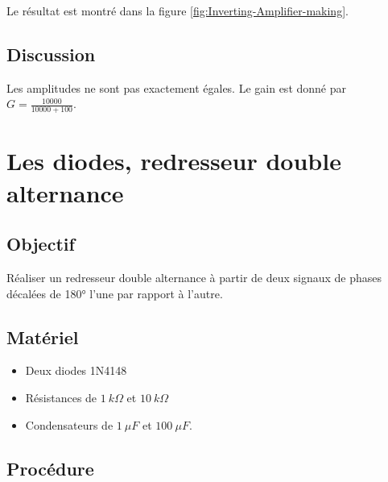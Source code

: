 \documentclass{book}
\begin{document}
Le résultat est montré dans la figure  \ref{fig:Inverting-Amplifier-making}.

\subsection{Discussion}


Les amplitudes ne sont pas exactement égales. Le gain est donné par $G=\frac{10000}{10000+100}$.







\section{Les diodes, redresseur double alternance}



\subsection{Objectif}


Réaliser un redresseur double alternance à partir de deux signaux de phases décalées de 180° l'une par rapport à l'autre.




\subsection{Matériel}


\begin{itemize}
  \item Deux diodes 1N4148
  \item Résistances de $1\ k\Omega$  et $10\ k\Omega$
  \item Condensateurs de $1\ \mu F$ et $100\ \mu F$.
\end{itemize}

\subsection{Procédure}
\end{document}
